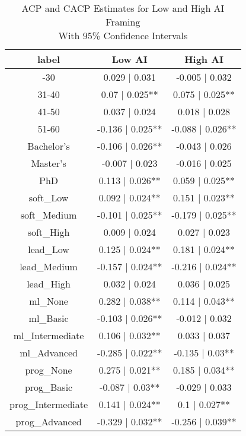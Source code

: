 \begin{table}[t]
\caption*{
{\large ACP and CACP Estimates for Low and High AI Framing} \\ 
{\small With 95\% Confidence Intervals}
} 
\fontsize{12.0pt}{14.4pt}\selectfont
\begin{tabular*}{\linewidth}{@{\extracolsep{\fill}}ccc}
\toprule
label & Low AI & High AI \\ 
\midrule\addlinespace[2.5pt]
21-30 & 0.029 | 0.031 & -0.005 | 0.032 \\ 
31-40 & 0.07 | 0.025** & 0.075 | 0.025** \\ 
41-50 & 0.037 | 0.024 & 0.018 | 0.028 \\ 
51-60 & -0.136 | 0.025** & -0.088 | 0.026** \\ 
Bachelor's & -0.106 | 0.026** & -0.043 | 0.026 \\ 
Master's & -0.007 | 0.023 & -0.016 | 0.025 \\ 
PhD & 0.113 | 0.026** & 0.059 | 0.025** \\ 
soft\_Low & 0.092 | 0.024** & 0.151 | 0.023** \\ 
soft\_Medium & -0.101 | 0.025** & -0.179 | 0.025** \\ 
soft\_High & 0.009 | 0.024 & 0.027 | 0.023 \\ 
lead\_Low & 0.125 | 0.024** & 0.181 | 0.024** \\ 
lead\_Medium & -0.157 | 0.024** & -0.216 | 0.024** \\ 
lead\_High & 0.032 | 0.024 & 0.036 | 0.025 \\ 
ml\_None & 0.282 | 0.038** & 0.114 | 0.043** \\ 
ml\_Basic & -0.103 | 0.026** & -0.012 | 0.032 \\ 
ml\_Intermediate & 0.106 | 0.032** & 0.033 | 0.037 \\ 
ml\_Advanced & -0.285 | 0.022** & -0.135 | 0.03** \\ 
prog\_None & 0.275 | 0.021** & 0.185 | 0.034** \\ 
prog\_Basic & -0.087 | 0.03** & -0.029 | 0.033 \\ 
prog\_Intermediate & 0.141 | 0.024** & 0.1 | 0.027** \\ 
prog\_Advanced & -0.329 | 0.032** & -0.256 | 0.039** \\ 
\bottomrule
\end{tabular*}
\end{table}


